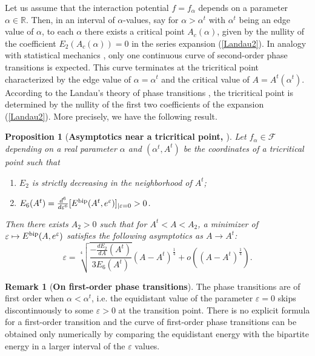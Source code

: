 \documentclass[12pt]{iopart}
\newtheorem{prop}[thm]{Proposition}
\theoremstyle{definition}
\newtheorem{remark}[thm]{Remark}
\begin{document}
Let us assume that the interaction potential $f=f_{\alpha}$ depends
on a parameter $\alpha\in\mathbb{R}$.
Then, in an interval of $\alpha$-values, say for $\alpha>\alpha^t$
with $\alpha^t$ being an edge value of $\alpha$,
to each $\alpha$ there exists a critical point $A_c(\alpha)$, given by
the nullity of the coefficient $E_2\left( A_c(\alpha)\right)=0$ in the
series expansion (\ref{Landau2}).
In analogy with statistical mechanics \cite{Bausch72,Griffiths70,Landau80},
only one continuous curve of second-order phase transitions is expected.
This curve terminates at the tricritical point characterized by
the edge value of $\alpha=\alpha^t$ and the critical value of
$A=A^t(\alpha^t)$.
According to the Landau's theory of phase transitions \cite{Landau37,Landau80},
the tricritical point is determined by the nullity of the first
two coefficients of the expansion (\ref{Landau2}).
More precisely, we have the following result.

\begin{prop}[\textbf{Asymptotics near a tricritical point, \cite{Betermin24}}]
Let $f_\alpha\in \mathcal{F}$ depending on a real parameter $\alpha$ and
$(\alpha^t,A^t)$ be the coordinates of a tricritical point such that
\begin{enumerate}
\item[(1)] $E_2$ is strictly decreasing in the neighborhood of $A^t$;
\item[(2)] $E_6(A^t)=\frac{d^6}{d\varepsilon^6}
[E^{\rm bip}(A^t,e^{\varepsilon})]_{|\varepsilon=0}>0$.
\end{enumerate}
Then there exists $A_2>0$ such that for $A^t<A<A_2$, a minimizer of
$\varepsilon\mapsto E^{\rm bip}(A,e^{\varepsilon})$ satisfies the following
asymptotics as $A\to A^t$:
$$
\varepsilon=\sqrt[4]{\frac{-\frac{d E_2}{d A}(A^t)}{3E_6(A^t)}}
(A-A^t)^{\frac{1}{4}}+o((A-A^t)^{\frac{1}{4}}).
$$
\end{prop}

\begin{remark}[\textbf{On first-order phase transitions}]
The phase transitions are of first order when $\alpha<\alpha^t$, i.e.
the equidistant value of the parameter $\varepsilon=0$ skips
discontinuously to some $\varepsilon>0$ at the transition point.
There is no explicit formula for a first-order transition and the curve of
first-order phase transitions can be obtained only numerically by comparing
the equidistant energy with the bipartite energy in a larger interval
of the $\varepsilon$ values.
\end{remark}
\end{document}
